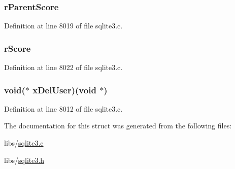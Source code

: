 \subsubsection[{r\+Parent\+Score}]{ r\+Parent\+Score}\label{structsqlite3__rtree__query__info_a95ec5d09980e043fcd87ecae7363cd5e}


Definition at line 8019 of file sqlite3.\+c.

\hypertarget{structsqlite3__rtree__query__info_ac027329f98ab575b6a491de532c688a1}{}
\subsubsection[{r\+Score}]{ r\+Score}\label{structsqlite3__rtree__query__info_ac027329f98ab575b6a491de532c688a1}


Definition at line 8022 of file sqlite3.\+c.

\hypertarget{structsqlite3__rtree__query__info_aa90fafba5714bc276f69c04adae44256}{}
\subsubsection[{x\+Del\+User}]{\setlength{\rightskip}{0pt plus 5cm}void($\ast$ x\+Del\+User)(void $\ast$)}\label{structsqlite3__rtree__query__info_aa90fafba5714bc276f69c04adae44256}


Definition at line 8012 of file sqlite3.\+c.



The documentation for this struct was generated from the following files\+:\begin{DoxyCompactItemize}
\item 
libs/\hyperlink{sqlite3_8c}{sqlite3.\+c}\item 
libs/\hyperlink{sqlite3_8h}{sqlite3.\+h}\end{DoxyCompactItemize}
